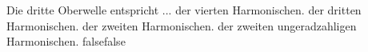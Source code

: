     {Die dritte Oberwelle entspricht ...}
    {der vierten Harmonischen.}
    {der dritten Harmonischen.}
    {der zweiten Harmonischen.}
    {der zweiten ungeradzahligen Harmonischen.}
    {false}{false}